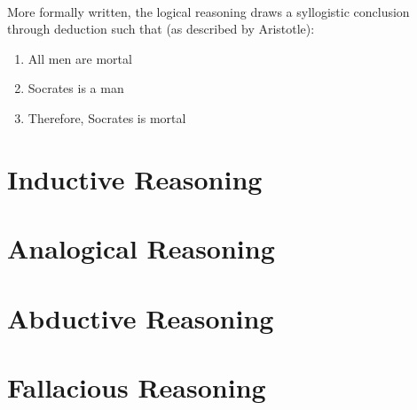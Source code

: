 \paragraph{}More formally written, the logical reasoning draws a syllogistic conclusion through deduction such that (as described by Aristotle):

\begin{enumerate}[label=\roman*]
    \item All men are mortal
    \item Socrates is a man
    \item Therefore, Socrates is mortal

\end{enumerate}

\section{Inductive Reasoning}

\section{Analogical Reasoning}

\section{Abductive Reasoning}

\section{Fallacious Reasoning}